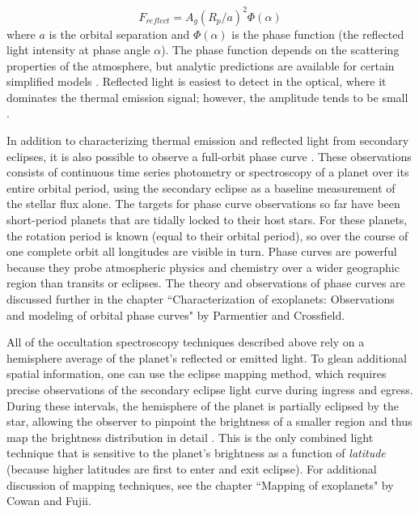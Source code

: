 \documentclass[graybox,natbib,nosecnum]{svmult}
\begin{document}
\begin{equation}
F_{reflect} = A_g(R_p/a)^2 \Phi(\alpha)
\end{equation}
where $a$ is the orbital separation and $\Phi(\alpha)$ is the phase function (the reflected light intensity at phase angle $\alpha$). The phase function depends on the scattering properties of the atmosphere, but analytic predictions are available for certain simplified models \citep[e.g.][]{madhu12}.  Reflected light is easiest to detect in the optical, where it dominates the thermal emission signal; however, the amplitude tends to be small \citep[typically less than 100 ppm;][]{angerhausen15}.

In addition to characterizing thermal emission and reflected light from secondary eclipses, it is also possible to observe a full-orbit phase curve \citep{seager00b, knutson07}. These observations consists of continuous time series photometry or spectroscopy of a planet over its entire orbital period, using the secondary eclipse as a baseline measurement of the stellar flux alone.  The targets for phase curve observations so far have been short-period planets that are tidally locked to their host stars. For these planets, the rotation period is known (equal to their orbital period), so over the course of one complete orbit all longitudes are visible in turn.  Phase curves are powerful because they probe atmospheric physics and chemistry over a wider geographic region than transits or eclipses. The theory and observations of phase curves are discussed further in the chapter ``Characterization of exoplanets: Observations and modeling of orbital phase curves" by Parmentier and Crossfield. 


All of the occultation spectroscopy techniques described above rely on a hemisphere average of the planet's reflected or emitted light. To glean additional spatial information, one can use the eclipse mapping method, which requires precise observations of the secondary eclipse light curve during ingress and egress.  During these intervals, the hemisphere of the planet is partially eclipsed by the star, allowing the observer to pinpoint the brightness of a smaller region and thus map the brightness distribution in detail \citep{rauscher07, dewit12}.  This is the only combined light technique that is sensitive to the planet's brightness as a function of \emph{latitude} (because higher latitudes are first to enter and exit eclipse). For additional discussion of mapping techniques, see the chapter ``Mapping of exoplanets" by Cowan and Fujii.
\end{document}
